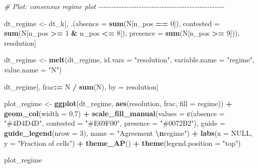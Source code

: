\documentclass[
  11pt,
]{article}
\newenvironment{Shaded}{\begin{snugshade}}{\end{snugshade}}
\newcommand{\AttributeTok}[1]{\textcolor[rgb]{0.13,0.29,0.53}{#1}}
\newcommand{\CommentTok}[1]{\textcolor[rgb]{0.56,0.35,0.01}{\textit{#1}}}
\newcommand{\ConstantTok}[1]{\textcolor[rgb]{0.56,0.35,0.01}{#1}}
\newcommand{\DecValTok}[1]{\textcolor[rgb]{0.00,0.00,0.81}{#1}}
\newcommand{\FloatTok}[1]{\textcolor[rgb]{0.00,0.00,0.81}{#1}}
\newcommand{\FunctionTok}[1]{\textcolor[rgb]{0.13,0.29,0.53}{\textbf{#1}}}
\newcommand{\NormalTok}[1]{#1}
\newcommand{\OtherTok}[1]{\textcolor[rgb]{0.56,0.35,0.01}{#1}}
\newcommand{\SpecialCharTok}[1]{\textcolor[rgb]{0.81,0.36,0.00}{\textbf{#1}}}
\newcommand{\StringTok}[1]{\textcolor[rgb]{0.31,0.60,0.02}{#1}}
\begin{document}
\begin{Shaded}
\begin{Highlighting}[]
\CommentTok{\# Plot: consensus regime plot {-}{-}{-}{-}{-}{-}{-}{-}{-}{-}{-}{-}{-}{-}{-}{-}{-}{-}{-}{-}{-}{-}{-}{-}{-}{-}{-}{-}{-}{-}{-}{-}{-}{-}{-}{-}{-}{-}{-}{-}{-}{-}{-}{-}{-}{-}{-}{-}{-}{-}}

\NormalTok{dt\_regime }\OtherTok{\textless{}{-}}\NormalTok{ dt\_k[, .(}\AttributeTok{absence =} \FunctionTok{sum}\NormalTok{(N[n\_pos }\SpecialCharTok{==} \DecValTok{0}\NormalTok{]),}
                      \AttributeTok{contested =} \FunctionTok{sum}\NormalTok{(N[n\_pos }\SpecialCharTok{\textgreater{}=} \DecValTok{1} \SpecialCharTok{\&}\NormalTok{ n\_pos }\SpecialCharTok{\textless{}=} \DecValTok{8}\NormalTok{]),}
                      \AttributeTok{presence =} \FunctionTok{sum}\NormalTok{(N[n\_pos }\SpecialCharTok{\textgreater{}=} \DecValTok{9}\NormalTok{])), resolution]}

\NormalTok{dt\_regime }\OtherTok{\textless{}{-}} \FunctionTok{melt}\NormalTok{(dt\_regime, }\AttributeTok{id.vars =} \StringTok{"resolution"}\NormalTok{, }\AttributeTok{variable.name =} \StringTok{"regime"}\NormalTok{,}
                  \AttributeTok{value.name =} \StringTok{"N"}\NormalTok{)}

\NormalTok{dt\_regime[, frac}\SpecialCharTok{:=}\NormalTok{ N }\SpecialCharTok{/} \FunctionTok{sum}\NormalTok{(N), by }\OtherTok{=}\NormalTok{ resolution]}

\NormalTok{plot\_regime }\OtherTok{\textless{}{-}} \FunctionTok{ggplot}\NormalTok{(dt\_regime, }\FunctionTok{aes}\NormalTok{(resolution, frac, }\AttributeTok{fill =}\NormalTok{ regime)) }\SpecialCharTok{+}
  \FunctionTok{geom\_col}\NormalTok{(}\AttributeTok{width =} \FloatTok{0.7}\NormalTok{) }\SpecialCharTok{+}
  \FunctionTok{scale\_fill\_manual}\NormalTok{(}\AttributeTok{values =} \FunctionTok{c}\NormalTok{(}\AttributeTok{absence =} \StringTok{"\#4D4D4D"}\NormalTok{,}
                               \AttributeTok{contested =} \StringTok{"\#E69F00"}\NormalTok{,}
                               \AttributeTok{presence =} \StringTok{"\#0072B2"}\NormalTok{), }
                    \AttributeTok{guide =} \FunctionTok{guide\_legend}\NormalTok{(}\AttributeTok{nrow =} \DecValTok{3}\NormalTok{), }
                    \AttributeTok{name =} \StringTok{"Agreement }\SpecialCharTok{\textbackslash{}n}\StringTok{regime"}\NormalTok{) }\SpecialCharTok{+}
  \FunctionTok{labs}\NormalTok{(}\AttributeTok{x =} \ConstantTok{NULL}\NormalTok{, }\AttributeTok{y =} \StringTok{"Fraction of cells"}\NormalTok{) }\SpecialCharTok{+}
  \FunctionTok{theme\_AP}\NormalTok{() }\SpecialCharTok{+}
  \FunctionTok{theme}\NormalTok{(}\AttributeTok{legend.position =} \StringTok{"top"}\NormalTok{)}
  

\NormalTok{plot\_regime}
\end{Highlighting}
\end{Shaded}
\end{document}
